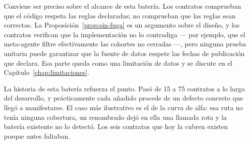 Conviene ser preciso sobre el alcance de esta batería. Los contratos comprueban que el código
respeta las reglas declaradas; no comprueban que las reglas sean correctas. La
Proposición~\ref{prop:sin-fuga} es un argumento sobre el diseño, y los contratos verifican que la
implementación no lo contradiga --- por ejemplo, que el meta-agente filtre efectivamente las
cohortes no cerradas ---, pero ninguna prueba unitaria puede garantizar que la fuente de datos
respete las fechas de publicación que declara. Esa parte queda como una limitación de datos y se
discute en el Capítulo~\ref{chap:limitaciones}.

La historia de esta batería refuerza el punto. Pasó de 15 a 75 contratos a lo largo del desarrollo,
y prácticamente cada añadido procede de un defecto concreto que llegó a manifestarse. El caso más
ilustrativo es el de la curva de alfa: esa ruta no tenía ninguna cobertura, un renombrado dejó en
ella una llamada rota y la batería existente no lo detectó. Los seis contratos que hoy la cubren
existen porque antes faltaban.
